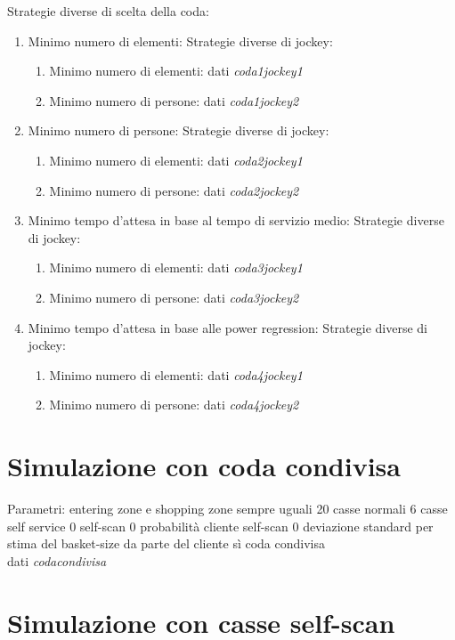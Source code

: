 Strategie diverse di scelta della coda:
\begin{enumerate}
	\item Minimo numero di elementi:
	Strategie diverse di jockey:
	\begin{enumerate}
		\item Minimo numero di elementi: dati \textit{coda1jockey1}
		\item Minimo numero di persone: dati \textit{coda1jockey2}
	\end{enumerate}
	\item Minimo numero di persone:
	Strategie diverse di jockey:
	\begin{enumerate}
		\item Minimo numero di elementi: dati \textit{coda2jockey1}
		\item Minimo numero di persone: dati \textit{coda2jockey2}
	\end{enumerate}
	\item Minimo tempo d'attesa in base al tempo di servizio medio:
	Strategie diverse di jockey:
	\begin{enumerate}
		\item Minimo numero di elementi: dati \textit{coda3jockey1}
		\item Minimo numero di persone: dati \textit{coda3jockey2}
	\end{enumerate}
	\item Minimo tempo d'attesa in base alle power regression: Strategie diverse di jockey:
	\begin{enumerate}
		\item Minimo numero di elementi: dati \textit{coda4jockey1}
		\item Minimo numero di persone: dati \textit{coda4jockey2}
	\end{enumerate}
\end{enumerate}

\section{Simulazione con coda condivisa}

Parametri:
entering zone e shopping zone sempre uguali
20 casse normali
6 casse self service
0 self-scan
0 probabilità cliente self-scan
0 deviazione standard per stima del basket-size da parte del cliente
sì coda condivisa
\\
dati \textit{codacondivisa}

\section{Simulazione con casse self-scan}

